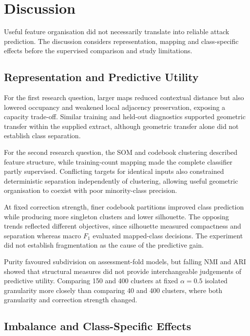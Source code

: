 \section{Discussion}

Useful feature organisation did not necessarily translate into reliable attack prediction. The discussion considers representation, mapping and class-specific effects before the supervised comparison and study limitations.

\subsection{Representation and Predictive Utility}

For the first research question, larger maps reduced contextual distance but also lowered occupancy and weakened local adjacency preservation, exposing a capacity trade-off. Similar training and held-out diagnostics supported geometric transfer within the supplied extract, although geometric transfer alone did not establish class separation.

For the second research question, the SOM and codebook clustering described feature structure, while training-count mapping made the complete classifier partly supervised. Conflicting targets for identical inputs also constrained deterministic separation independently of clustering, allowing useful geometric organisation to coexist with poor minority-class precision.

At fixed correction strength, finer codebook partitions improved class prediction while producing more singleton clusters and lower silhouette. The opposing trends reflected different objectives, since silhouette measured compactness and separation whereas macro $F_1$ evaluated mapped-class decisions. The experiment did not establish fragmentation as the cause of the predictive gain.

Purity favoured subdivision on assessment-fold models, but falling NMI and ARI showed that structural measures did not provide interchangeable judgements of predictive utility. Comparing 150 and 400 clusters at fixed $\alpha=0.5$ isolated granularity more closely than comparing 40 and 400 clusters, where both granularity and correction strength changed.

\subsection{Imbalance and Class-Specific Effects}


